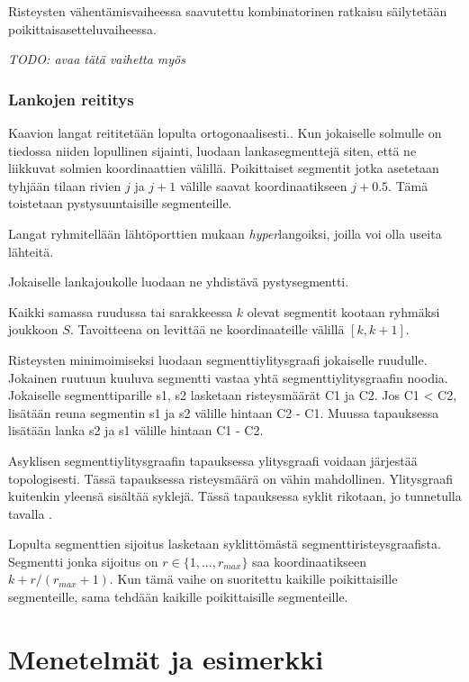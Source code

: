 \documentclass[finnish,12pt]{article}
\begin{document}
Risteysten vähentämisvaiheessa saavutettu kombinatorinen ratkaisu säilytetään poikittaisasetteluvaiheessa.

\cite{RefWorks:49}

\emph{TODO: avaa tätä vaihetta myös}

		\subsubsection{Lankojen reititys}


Kaavion langat reititetään lopulta ortogonaalisesti..\cite{RefWorks:17}
Kun jokaiselle solmulle on tiedossa niiden lopullinen sijainti, luodaan lankasegmenttejä siten, että ne liikkuvat solmien koordinaattien välillä.
Poikittaiset segmentit jotka asetetaan tyhjään tilaan rivien $j$ ja $j+1$ välille saavat koordinaatikseen $j+0.5$.
Tämä toistetaan pystysuuntaisille segmenteille.

Langat ryhmitellään lähtöporttien mukaan \emph{hyper}langoiksi, joilla voi olla useita lähteitä.

Jokaiselle lankajoukolle luodaan ne yhdistävä pystysegmentti.

Kaikki samassa ruudussa tai sarakkeessa $k$ olevat segmentit kootaan ryhmäksi joukkoon $S$.
Tavoitteena on levittää ne koordinaateille välillä $[k,k+1]$.

Risteysten minimoimiseksi luodaan segmenttiylitysgraafi jokaiselle ruudulle.
Jokainen ruutuun kuuluva segmentti vastaa yhtä segmenttiylitysgraafin noodia.
Jokaiselle segmenttiparille s1, s2 lasketaan risteysmäärät C1 ja C2. Jos C1 < C2, lisätään reuna segmentin s1 ja s2 välille hintaan C2 - C1. Muussa tapauksessa lisätään lanka s2 ja s1 välille hintaan C1 - C2.

Asyklisen segmenttiylitysgraafin tapauksessa ylitysgraafi voidaan järjestää topologisesti.
Tässä tapauksessa risteysmäärä on vähin mahdollinen.
Ylitysgraafi kuitenkin yleensä sisältää syklejä. Tässä tapauksessa syklit rikotaan, jo tunnetulla tavalla \cite{RefWorks:48}.

Lopulta segmenttien sijoitus lasketaan syklittömästä segmenttiristeysgraafista.
Segmentti jonka sijoitus on $r \in \{1,...,r_{max}\}$ saa koordinaatikseen $k + r/(r_{max} +1)$.
Kun tämä vaihe on suoritettu kaikille poikittaisille segmenteille, sama tehdään kaikille poikittaisille segmenteille.

	\clearpage
	\section{Menetelmät ja esimerkki}
\end{document}
